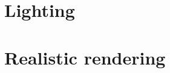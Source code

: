 \documentclass[12pt, a4paper]{report}
\begin{document}
    \chapter{Lighting}
    
    
    
    
    
    
    
    
    

    \chapter{Realistic rendering}
    
\end{document}
